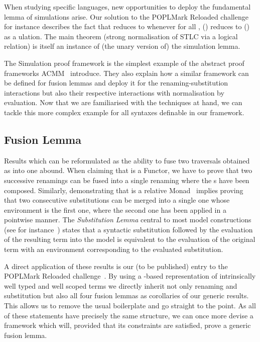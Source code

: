 When studying specific languages, new opportunities to deploy the
fundamental lemma of simulations arise. Our solution to the POPLMark
Reloaded challenge for instance describes the fact that { \AB{$\rho$} }
reduces to {  } whenever for all ,
\AB{$\rho$}() reduces to () as a ulation.
The main theorem (strong normalisation of STLC via a logical relation)
is itself an instance of (the unary version of) the simulation lemma.

The Simulation proof framework is the simplest example of the abstract
proof frameworks ACMM~\citeyear{allais2017type} introduce. They also
explain how a similar framework can be defined
for fusion lemmas and deploy it for the renaming-substitution interactions
but also their respective interactions with normalisation by evaluation.
Now that we are familiarised with the techniques at hand, we can tackle
this more complex example for all syntaxes definable in our framework.



\subsection{Fusion Lemma}\label{section:fusion}

Results which can be reformulated as the ability to fuse two traversals
obtained as \semrec{} into one abound. When claiming that  is
a Functor, we have to prove that two successive renamings can be fused into
a single renaming where the s have been composed. Similarly,
demonstrating that  is a relative Monad~\cite{JFR4389} implies proving
that two consecutive substitutions can be merged into a single one whose
environment is the first one, where the second one has been applied in a
pointwise manner. The \emph{Substitution Lemma} central
to most model constructions (see for instance~\cite{mitchell1991kripke}) states
that a syntactic substitution followed by the evaluation of the resulting term
into the model is equivalent to the evaluation of the original term with an
environment corresponding to the evaluated substitution.

A direct application of these results is our (to be published) entry to the
POPLMark Reloaded challenge~\citeyear{poplmarkreloaded}. By using a -based
representation of intrinsically well typed and well scoped terms we directly inherit
not only renaming and substitution but also all four fusion lemmas as corollaries
of our generic results. This allows us to remove the usual boilerplate
and go straight to the point.
As all of these statements have precisely the same structure, we can
once more devise a framework which will, provided that its constraints are
satisfied, prove a generic fusion lemma.

